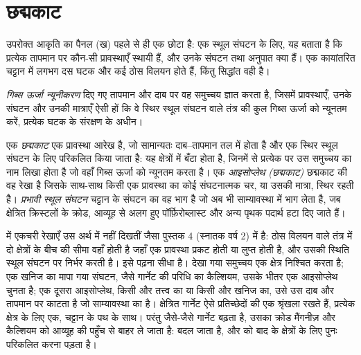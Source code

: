 \section{छद्मकाट}\label{sec:b3:petrological-thermodynamics:pseudosections}

उपरोक्त आकृति का पैनल (ख) पहले से ही एक छोटा  है: एक स्थूल संघटन के लिए,
यह बताता है कि प्रत्येक तापमान पर कौन-सी प्रावस्थाएँ स्थायी हैं, और
उनके संघटन तथा अनुपात क्या हैं। एक कायांतरित चट्टान में लगभग दस
घटक और कई ठोस विलयन होते हैं, किंतु सिद्धांत वही है।

\begin{definition}[गिब्स ऊर्जा न्यूनीकरण]\label{def:b3:petrological-thermodynamics:minimisation}
\emph{गिब्स ऊर्जा न्यूनीकरण} दिए गए तापमान और दाब पर
वह समुच्चय ज्ञात करता है, जिसमें प्रावस्थाएँ, उनके संघटन और उनकी मात्राएँ
ऐसी हों कि वे स्थिर स्थूल संघटन वाले तंत्र की कुल गिब्स ऊर्जा को न्यूनतम करें,
प्रत्येक घटक के संरक्षण के अधीन।
\end{definition}

\begin{definition}\label{def:b3:petrological-thermodynamics:pseudosection}
एक \emph{छद्मकाट} एक प्रावस्था आरेख है, जो सामान्यतः दाब--तापमान तल में होता है
और एक स्थिर स्थूल संघटन के लिए परिकलित किया जाता है: यह क्षेत्रों में बँटा होता है,
जिनमें से प्रत्येक पर उस समुच्चय का नाम लिखा होता है जो
वहाँ गिब्स ऊर्जा को न्यूनतम करता है। एक \emph{आइसोप्लेथ (छद्मकाट)}
छद्मकाट की वह रेखा है जिसके साथ-साथ किसी एक प्रावस्था का कोई संघटनात्मक चर,
या उसकी मात्रा, स्थिर रहती है। \emph{प्रभावी स्थूल संघटन}
चट्टान के संघटन का वह भाग है जो अब भी साम्यावस्था में भाग लेता है,
जब क्षेत्रित क्रिस्टलों के क्रोड,
आव्यूह से अलग हुए पॉर्फ़िरोब्लास्ट
और अन्य पृथक पदार्थ हटा दिए जाते हैं।
\end{definition}

 में एकचरी रेखाएँ उस अर्थ में नहीं दिखतीं जैसा
पुस्तक 4 (स्नातक वर्ष 2) में है: ठोस विलयन वाले तंत्र में दो क्षेत्रों के बीच की सीमा
वहाँ होती है जहाँ एक प्रावस्था प्रकट होती या लुप्त होती है, और उसकी स्थिति स्थूल संघटन पर निर्भर करती है।
इसे पढ़ना सीधा है। देखा गया समुच्चय एक क्षेत्र निश्चित करता है;
एक खनिज का मापा गया संघटन, जैसे गार्नेट की परिधि का कैल्शियम,
उसके भीतर एक आइसोप्लेथ चुनता है; एक दूसरा आइसोप्लेथ, किसी और तत्त्व का
या किसी और खनिज का, उसे उस दाब और तापमान पर काटता है जो
साम्यावस्था का है। क्षेत्रित गार्नेट ऐसे प्रतिच्छेदों की एक श्रृंखला रखते हैं,
प्रत्येक क्षेत्र के लिए एक, चट्टान के पथ के साथ। परंतु जैसे-जैसे गार्नेट बढ़ता है, उसका क्रोड मैंगनीज़ और कैल्शियम को
आव्यूह की पहुँच से बाहर ले जाता है:  बदल जाता है,
और  को
बाद के क्षेत्रों के लिए पुनः परिकलित करना पड़ता है।

